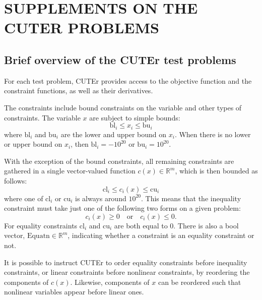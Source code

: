 \chapter{SUPPLEMENTS ON THE CUTER PROBLEMS}

\section{Brief overview of the CUTEr test problems}\label{sec:cuternm}
For each test problem, CUTEr provides access to the objective function and the constraint functions, as well as their derivatives.

The constraints include bound constraints on the variable and other types of constraints. The variable $x$ are subject to simple bounds:
\begin{equation*}
\text{bl}_i \leq x_i \leq \text{bu}_i  
\end{equation*}
where $\text{bl}_i$ and $\text{bu}_i$ are the lower and upper bound on $x_i$. When there is no lower or upper bound on $x_i$, then $\text{bl}_i = -10^{20}$ or $\text{bu}_i = 10^{20}$. 

With the exception of the bound constraints, all remaining 
constraints are gathered in a single vector-valued function $c(x) \in \mathbb{R}^m$, which is then bounded as follows:   
\begin{equation*}
\text{cl}_i \leq c_i(x) \leq \text{cu}_i  
\end{equation*}
where one of $\text{cl}_i$ or $\text{cu}_i$ is always around $10^{20}$. This means that the inequality constraint must take just one of 
the following two forms on a given problem:
\begin{equation*}
c_i(x) \geq 0   \quad  \text{or}  \quad  c_i(x) \leq 0.
\end{equation*}
For equality constraints $\text{cl}_i$ and $\text{cu}_i$ are both equal to 0. There is also a bool vector, $\text{Equatn} \in \mathbb{R}^m$, indicating whether a constraint is an equality constraint or not. 

It is possible to instruct CUTEr to order equality constraints before inequality constraints, or linear constraints before nonlinear constraints, by reordering the components of $c(x)$. Likewise, components of $x$ can be reordered such that nonlinear variables appear before linear ones. 

